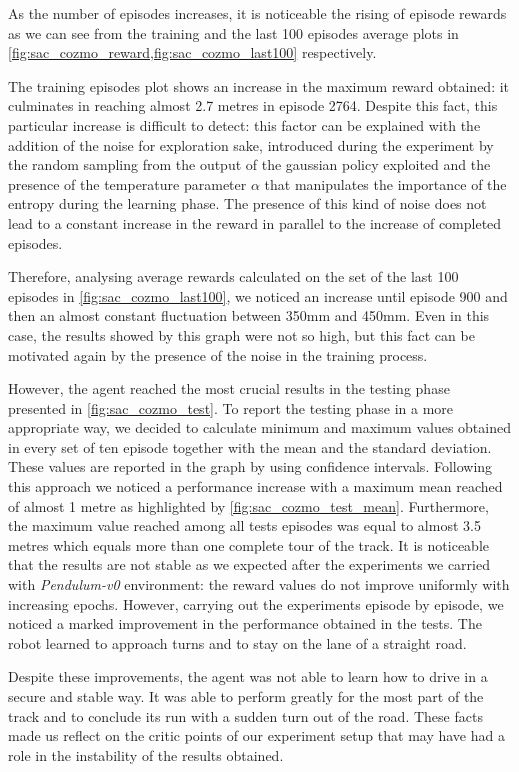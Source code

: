 As the number of episodes increases, it is noticeable the rising of episode rewards as we can see from the training and the last 100 episodes average plots in \vref{fig:sac_cozmo_reward,fig:sac_cozmo_last100} respectively.

The training episodes plot shows an increase in the maximum reward obtained: it culminates in reaching almost 2.7 metres in episode 2764.
Despite this fact, this particular increase is difficult to detect: this factor can be explained with the addition of the noise for exploration sake, introduced during the experiment by the random sampling from the output of the gaussian policy exploited and the presence of the temperature parameter $\alpha$ that manipulates the importance of the entropy during the learning phase. The presence of this kind of noise does not lead to a constant increase in the reward in parallel to the increase of completed episodes.

Therefore, analysing average rewards calculated on the set of the last 100 episodes in \vref{fig:sac_cozmo_last100}, we noticed an increase until episode 900 and then an almost constant fluctuation between 350mm and 450mm.
Even in this case, the results showed by this graph were not so high, but this fact can be motivated again by the presence of the noise in the training process.

However, the agent reached the most crucial results in the testing phase presented in \vref{fig:sac_cozmo_test}.
To report the testing phase in a more appropriate way, we decided to calculate minimum and maximum values obtained in every set of ten episode together with the mean and the standard deviation.
These values are reported in the graph by using confidence intervals.
Following this approach we noticed a performance increase with a maximum mean reached of almost 1 metre as highlighted by \vref{fig:sac_cozmo_test_mean}.
Furthermore, the maximum value reached among all tests episodes was equal to almost 3.5 metres which equals more than one complete tour of the track.
It is noticeable that the results are not stable as we expected after the experiments we carried with \textit{Pendulum-v0} environment: the reward values do not improve uniformly with increasing epochs.
However, carrying out the experiments episode by episode, we noticed a marked improvement in the performance obtained in the tests. The robot learned to approach turns and to stay on the lane of a straight road.

Despite these improvements, the agent was not able to learn how to drive in a secure and stable way.
It was able to perform greatly for the most part of the track and to conclude its run with a sudden turn out of the road.
These facts made us reflect on the critic points of our experiment setup that may have had a role in the instability of the results obtained.

